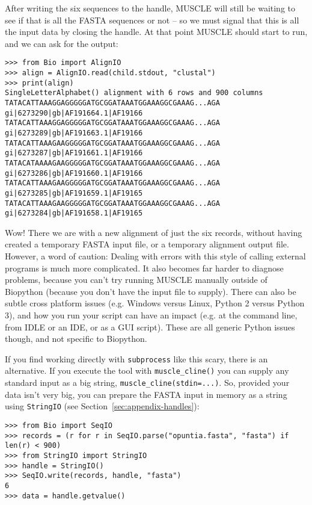 \documentclass{report}
\begin{document}
After writing the six sequences to the handle, MUSCLE will still be waiting
to see if that is all the FASTA sequences or not -- so we must signal that
this is all the input data by closing the handle. At that point MUSCLE should
start to run, and we can ask for the output:

\begin{verbatim}
>>> from Bio import AlignIO
>>> align = AlignIO.read(child.stdout, "clustal")
>>> print(align)
SingleLetterAlphabet() alignment with 6 rows and 900 columns
TATACATTAAAGGAGGGGGATGCGGATAAATGGAAAGGCGAAAG...AGA gi|6273290|gb|AF191664.1|AF19166
TATACATTAAAGGAGGGGGATGCGGATAAATGGAAAGGCGAAAG...AGA gi|6273289|gb|AF191663.1|AF19166
TATACATTAAAGAAGGGGGATGCGGATAAATGGAAAGGCGAAAG...AGA gi|6273287|gb|AF191661.1|AF19166
TATACATAAAAGAAGGGGGATGCGGATAAATGGAAAGGCGAAAG...AGA gi|6273286|gb|AF191660.1|AF19166
TATACATTAAAGAAGGGGGATGCGGATAAATGGAAAGGCGAAAG...AGA gi|6273285|gb|AF191659.1|AF19165
TATACATTAAAGAAGGGGGATGCGGATAAATGGAAAGGCGAAAG...AGA gi|6273284|gb|AF191658.1|AF19165
\end{verbatim}

Wow! There we are with a new alignment of just the six records, without having created
a temporary FASTA input file, or a temporary alignment output file. However, a word of
caution: Dealing with errors with this style of calling external programs is much more
complicated.
It also becomes far harder to diagnose problems, because you can't try running MUSCLE
manually outside of Biopython (because you don't have the input file to supply).
There can also be subtle cross platform issues (e.g. Windows versus Linux,
Python 2 versus Python 3), and how
you run your script can have an impact (e.g. at the command line, from IDLE or an
IDE, or as a GUI script). These are all generic Python issues though, and not
specific to Biopython.

If you find working directly with \texttt{subprocess} like this scary, there is an
alternative. If you execute the tool with \texttt{muscle\_cline()} you can supply
any standard input as a big string, \texttt{muscle\_cline(stdin=...)}. So,
provided your data isn't very big, you can prepare the FASTA input in memory as
a string using \texttt{StringIO} (see Section~\ref{sec:appendix-handles}):

\begin{verbatim}
>>> from Bio import SeqIO
>>> records = (r for r in SeqIO.parse("opuntia.fasta", "fasta") if len(r) < 900)
>>> from StringIO import StringIO
>>> handle = StringIO()
>>> SeqIO.write(records, handle, "fasta")
6
>>> data = handle.getvalue()
\end{verbatim}
\end{document}
